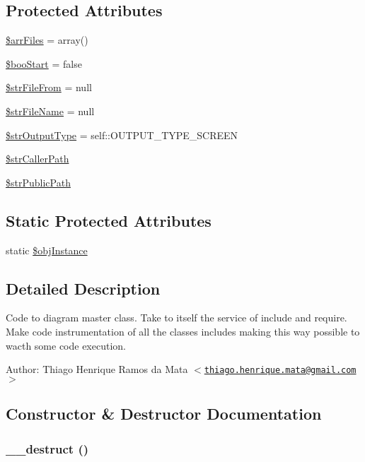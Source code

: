 \subsection*{Protected Attributes}
\begin{CompactItemize}
\item 
\hyperlink{class_code_to_diagram_8e74bce736504d1da15b87b4da6da83d}{\$arrFiles} = array()
\item 
\hyperlink{class_code_to_diagram_8e7e7887be9a69348bcb5ec86877ac24}{\$booStart} = false
\item 
\hyperlink{class_code_to_diagram_b21d5fc633f2f024c72f18e4ce63555f}{\$strFileFrom} = null
\item 
\hyperlink{class_code_to_diagram_f2f34642a0d84201c7dc5604c26a5f87}{\$strFileName} = null
\item 
\hyperlink{class_code_to_diagram_d609791f2fec4dc724795fce09b4fbb9}{\$strOutputType} = self::OUTPUT\_\-TYPE\_\-SCREEN
\item 
\hyperlink{class_code_to_diagram_80901f2e74e755896ca3914ff039dab9}{\$strCallerPath}
\item 
\hyperlink{class_code_to_diagram_5fa653f11488edb1d638093f347807f5}{\$strPublicPath}
\end{CompactItemize}
\subsection*{Static Protected Attributes}
\begin{CompactItemize}
\item 
static \hyperlink{class_code_to_diagram_917d057900327b25608ed26c927eac3b}{\$objInstance}
\end{CompactItemize}


\subsection{Detailed Description}
Code to diagram master class. Take to itself the service of include and require. Make code instrumentation of all the classes includes making this way possible to wacth some code execution.

\begin{Desc}
\item[Author:]Thiago Henrique Ramos da Mata $<$\href{mailto:thiago.henrique.mata@gmail.com}{\tt thiago.henrique.mata@gmail.com}$>$ \end{Desc}


\subsection{Constructor \& Destructor Documentation}
\hypertarget{class_code_to_diagram_421831a265621325e1fdd19aace0c758}{
\subsubsection[{\_\-\_\-destruct}]{\setlength{\rightskip}{0pt plus 5cm}\_\-\_\-destruct ()}}
\label{class_code_to_diagram_421831a265621325e1fdd19aace0c758}


